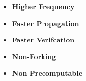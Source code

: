 \begin{itemize}
    \item \textbf{Higher Frequency}
    \item \textbf{Faster Propagation}
    \item \textbf{Faster Verifcation}
    \item \textbf{Non-Forking}
    \item \textbf{Non Precomputable}
    
\end{itemize}

